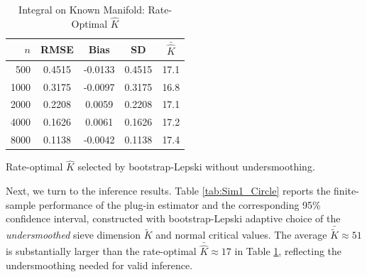 \documentclass[12pt,american]{article}
\theoremstyle{definition}
\theoremstyle{plain}
\theoremstyle{definition}
\theoremstyle{plain}
\theoremstyle{plain}
\theoremstyle{plain}
\theoremstyle{plain}
\theoremstyle{plain}
\begin{document}
\begin{table}[h]
  \centering
  \caption{Integral on Known Manifold: Rate-Optimal $\hat{K}$}
  \label{tab:Sim1_Circle_RateOpt}
  \begin{threeparttable}
    \begin{tabular}{rcccc}
      \toprule
      $n$ & RMSE & Bias & SD & $\bar{\hat{K}}$ \\
      \midrule
      500  & 0.4515 & -0.0133 & 0.4515 & 17.1 \\
      1000 & 0.3175 & -0.0097 & 0.3175 & 16.8 \\
      2000 & 0.2208 &  0.0059 & 0.2208 & 17.1 \\
      4000 & 0.1626 &  0.0061 & 0.1626 & 17.2 \\
      8000 & 0.1138 & -0.0042 & 0.1138 & 17.4 \\
      \bottomrule
    \end{tabular}
    \begin{tablenotes}
      \footnotesize
    \item Rate-optimal $\hat{K}$ selected by bootstrap-Lepski without undersmoothing.
    \end{tablenotes}
  \end{threeparttable}
\end{table}

Next, we turn to the inference results. Table \ref{tab:Sim1_Circle} reports the finite-sample performance of the plug-in estimator and the corresponding 95\% confidence interval, constructed with bootstrap-Lepski adaptive choice of the \emph{undersmoothed} sieve dimension $\tilde{K}$ and normal critical values. The average $\bar{\tilde{K}} \approx 51$ is substantially larger than the rate-optimal $\bar{\hat{K}} \approx 17$ in Table \ref{tab:Sim1_Circle_RateOpt}, reflecting the undersmoothing needed for valid inference.
\end{document}
